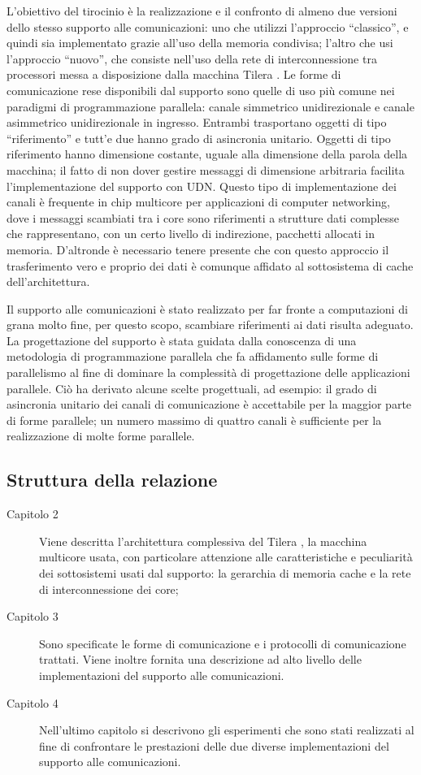L'obiettivo del tirocinio \`e la realizzazione e il confronto di almeno due versioni dello stesso supporto alle comunicazioni: uno che utilizzi l'approccio ``classico'', e quindi sia implementato grazie all'uso della memoria condivisa; l'altro che usi l'approccio ``nuovo'', che consiste nell'uso della rete di interconnessione tra processori messa a disposizione dalla macchina Tilera \tile.
Le forme di comunicazione rese disponibili dal supporto sono quelle di uso pi\`u comune nei paradigmi di programmazione parallela: canale simmetrico unidirezionale e canale asimmetrico unidirezionale in ingresso. Entrambi trasportano oggetti di tipo ``riferimento'' e tutt'e due hanno grado di asincronia unitario. 
Oggetti di tipo riferimento hanno dimensione costante, uguale alla dimensione della parola della macchina; il fatto di non dover gestire messaggi di dimensione arbitraria facilita l'implementazione del supporto con UDN. 
Questo tipo di implementazione dei canali \`e frequente in chip multicore per applicazioni di computer networking, dove i messaggi scambiati tra i core sono riferimenti a strutture dati complesse che rappresentano, con un certo livello di indirezione, pacchetti allocati in memoria. D'altronde \`e necessario tenere presente che con questo approccio il trasferimento vero e proprio dei dati \`e comunque affidato al sottosistema di cache dell'architettura.

Il supporto alle comunicazioni \`e stato realizzato per far fronte a computazioni di grana molto fine, per questo scopo, scambiare riferimenti ai dati risulta adeguato. La progettazione del supporto \`e stata guidata dalla conoscenza di una metodologia di programmazione parallela che fa affidamento sulle forme di parallelismo al fine di dominare la complessit\`a di progettazione delle applicazioni parallele. Ci\`o ha derivato alcune scelte progettuali, ad esempio: il grado di asincronia unitario dei canali di comunicazione \`e accettabile per la maggior parte di forme parallele; un numero massimo di quattro canali \`e sufficiente per la realizzazione di molte forme parallele.

\subsection*{Struttura della relazione}
\begin{description}
\item [Capitolo 2]
Viene descritta l'architettura complessiva del Tilera \tile, la macchina multicore usata, con particolare attenzione alle caratteristiche e peculiarit\`a dei sottosistemi usati dal supporto: la gerarchia di memoria cache e la rete di interconnessione dei core;
\item [Capitolo 3]
Sono specificate le forme di comunicazione e i protocolli di comunicazione trattati. Viene inoltre fornita una descrizione ad alto livello delle implementazioni del supporto alle comunicazioni.
\item [Capitolo 4]
Nell'ultimo capitolo si descrivono gli esperimenti che sono stati realizzati al fine di confrontare le prestazioni delle due diverse implementazioni del supporto alle comunicazioni. 
\end{description}
